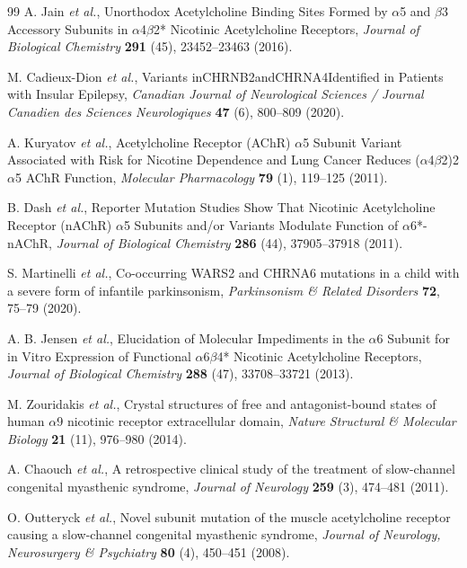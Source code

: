 \documentclass{ws-procs11x85}
\begin{document}
\begin{thebibliography}{99}
A. Jain {\em et al.}, Unorthodox Acetylcholine Binding Sites Formed by $\alpha$5 and $\beta$3 Accessory Subunits in $\alpha$4$\beta$2* Nicotinic Acetylcholine Receptors, {\em Journal of Biological Chemistry} {\bf 291} (45), 23452--23463 (2016).

M. Cadieux-Dion {\em et al.}, Variants inCHRNB2andCHRNA4Identified in Patients with Insular Epilepsy, {\em Canadian Journal of Neurological Sciences / Journal Canadien des Sciences Neurologiques} {\bf 47} (6), 800--809 (2020).

A. Kuryatov {\em et al.}, Acetylcholine Receptor (AChR) $\alpha$5 Subunit Variant Associated with Risk for Nicotine Dependence and Lung Cancer Reduces ($\alpha$4$\beta$2)2$\alpha$5 AChR Function, {\em Molecular Pharmacology} {\bf 79} (1), 119--125 (2011).

B. Dash {\em et al.}, Reporter Mutation Studies Show That Nicotinic Acetylcholine Receptor (nAChR) $\alpha$5 Subunits and/or Variants Modulate Function of $\alpha$6*-nAChR, {\em Journal of Biological Chemistry} {\bf 286} (44), 37905--37918 (2011).

S. Martinelli {\em et al.}, Co-occurring WARS2 and CHRNA6 mutations in a child with a severe form of infantile parkinsonism, {\em Parkinsonism \& Related Disorders} {\bf 72}, 75--79 (2020).

A. B. Jensen {\em et al.}, Elucidation of Molecular Impediments in the $\alpha$6 Subunit for in Vitro Expression of Functional $\alpha$6$\beta$4* Nicotinic Acetylcholine Receptors, {\em Journal of Biological Chemistry} {\bf 288} (47), 33708--33721 (2013).

M. Zouridakis {\em et al.}, Crystal structures of free and antagonist-bound states of human $\alpha$9 nicotinic receptor extracellular domain, {\em Nature Structural \& Molecular Biology} {\bf 21} (11), 976--980 (2014).

A. Chaouch {\em et al.}, A retrospective clinical study of the treatment of slow-channel congenital myasthenic syndrome, {\em Journal of Neurology} {\bf 259} (3), 474--481 (2011).

O. Outteryck {\em et al.}, Novel   subunit mutation of the muscle acetylcholine receptor causing a slow-channel congenital myasthenic syndrome, {\em Journal of Neurology, Neurosurgery \& Psychiatry} {\bf 80} (4), 450--451 (2008).


\end{thebibliography}
\end{document}

